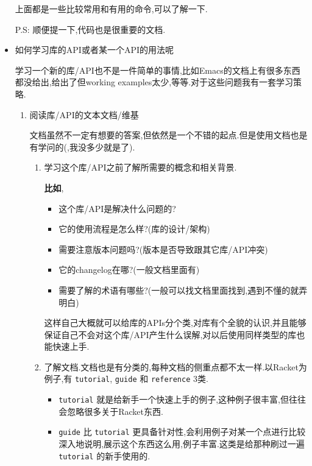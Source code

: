 \documentclass[11pt]{article}
\begin{document}
\begin{itemize}
上面都是一些比较常用和有用的命令,可以了解一下.

P.S: 顺便提一下,代码也是很重要的文档.

\item 如何学习库的API或者某一个API的用法呢

学习一个新的库/API也不是一件简单的事情,比如Emacs的文档上有很多东西都没给出,给出了但working examples太少,等等.对于这些问题我有一套学习策略.

\begin{enumerate}
\item 阅读库/API的文本文档/维基

文档虽然不一定有想要的答案,但依然是一个不错的起点.但是使用文档也是有学问的(,我没多少就是了).

\begin{enumerate}
\item 学习这个库/API之前了解所需要的概念和相关背景.

\textbf{比如},

\begin{itemize}
\item 这个库/API是解决什么问题的?

\item 它的使用流程是怎么样?(库的设计/架构)

\item 需要注意版本问题吗?(版本是否导致跟其它库/API冲突)

\item 它的changelog在哪?(一般文档里面有)

\item 需要了解的术语有哪些?(一般可以找文档里面找到,遇到不懂的就弄明白)
\end{itemize}

这样自己大概就可以给库的APIs分个类,对库有个全貌的认识,并且能够保证自己不会对这个库/API产生什么误解,对以后使用同样类型的库也能快速上手.

\item 了解文档.文档也是有分类的,每种文档的侧重点都不太一样.以Racket为例子,有 \texttt{tutorial}, \texttt{guide} 和 \texttt{reference} 3类.

\begin{itemize}
\item \texttt{tutorial} 就是给新手一个快速上手的例子,这种例子很丰富,但往往会忽略很多关于Racket东西.

\item \texttt{guide} 比 \texttt{tutorial} 更具备针对性,会利用例子对某一个点进行比较深入地说明,展示这个东西这么用,例子丰富.这类是给那种刷过一遍 \texttt{tutorial} 的新手使用的.


\end{itemize}
\end{enumerate}
\end{enumerate}
\end{itemize}
\end{document}
